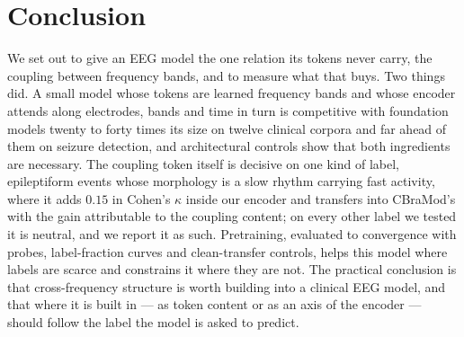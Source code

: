 \section{Conclusion}
\label{sec:conclusion}

We set out to give an EEG model the one relation its tokens never carry,
the coupling between frequency bands, and to measure what that buys. Two
things did. A small model whose tokens are learned frequency bands and
whose encoder attends along electrodes, bands and time in turn is
competitive with foundation models twenty to forty times its size on twelve
clinical corpora and far ahead of them on seizure detection, and
architectural controls show that both ingredients are necessary. The
coupling token itself is decisive on one kind of label, epileptiform events
whose morphology is a slow rhythm carrying fast activity, where it adds
$0.15$ in Cohen's $\kappa$ inside our encoder and transfers into CBraMod's
with the gain attributable to the coupling content; on every other label we
tested it is neutral, and we report it as such. Pretraining, evaluated to
convergence with probes, label-fraction curves and clean-transfer
controls, helps this model where labels are scarce and constrains it where
they are not. The practical conclusion is that cross-frequency structure
is worth building into a clinical EEG model, and that where it is built in
--- as token content or as an axis of the encoder --- should follow the
label the model is asked to predict.
